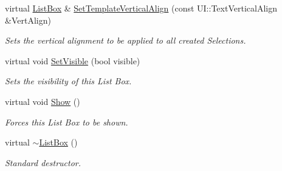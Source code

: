 \begin{DoxyCompactItemize}
virtual \hyperlink{classphys_1_1UI_1_1ListBox}{ListBox} \& \hyperlink{classphys_1_1UI_1_1ListBox_ab3b48e58a0049552c22aa17b7b8e8f1f}{SetTemplateVerticalAlign} (const UI::TextVerticalAlign \&VertAlign)
\begin{DoxyCompactList}\small\item\em Sets the vertical alignment to be applied to all created Selections. \item\end{DoxyCompactList}\item 
virtual void \hyperlink{classphys_1_1UI_1_1ListBox_abb3c87bf6669100296c1fa4f4913ea33}{SetVisible} (bool visible)
\begin{DoxyCompactList}\small\item\em Sets the visibility of this List Box. \item\end{DoxyCompactList}\item 
\hypertarget{classphys_1_1UI_1_1ListBox_add82890a307bc8fc984a0a029cfb88ae}{
virtual void \hyperlink{classphys_1_1UI_1_1ListBox_add82890a307bc8fc984a0a029cfb88ae}{Show} ()}
\label{classphys_1_1UI_1_1ListBox_add82890a307bc8fc984a0a029cfb88ae}

\begin{DoxyCompactList}\small\item\em Forces this List Box to be shown. \item\end{DoxyCompactList}\item 
\hypertarget{classphys_1_1UI_1_1ListBox_a582423223a2e310afc2a32c84d937502}{
virtual \hyperlink{classphys_1_1UI_1_1ListBox_a582423223a2e310afc2a32c84d937502}{$\sim$ListBox} ()}
\label{classphys_1_1UI_1_1ListBox_a582423223a2e310afc2a32c84d937502}

\begin{DoxyCompactList}\small\item\em Standard destructor. \item\end{DoxyCompactList}\end{DoxyCompactItemize}
